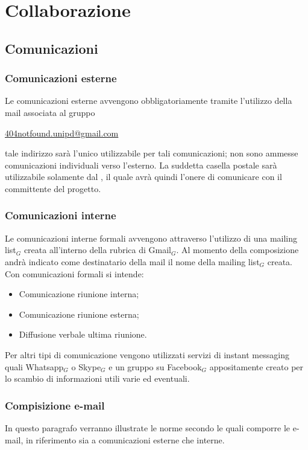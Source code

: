 \section{Collaborazione} \label{collaborazione}
\subsection{Comunicazioni}
\subsubsection{Comunicazioni esterne}
Le comunicazioni esterne avvengono obbligatoriamente tramite l’utilizzo della mail associata al gruppo
\begin{center} \href{mailto:404notfound.unipd@gmail.com}{404notfound.unipd@gmail.com}
\end{center}
tale indirizzo sarà l’unico utilizzabile per tali comunicazioni; non sono ammesse comunicazioni individuali verso l’esterno.
La suddetta casella postale sarà utilizzabile solamente dal \ruoloResponsabile, il quale avrà quindi l’onere di comunicare con il committente del progetto.

\subsubsection{Comunicazioni interne}
Le comunicazioni interne formali avvengono attraverso l’utilizzo di una mailing list$_G$ creata all'interno della rubrica di Gmail$_G$. Al momento della composizione andrà indicato come destinatario della mail il nome della mailing list$_G$ creata.
Con comunicazioni formali si intende:
\begin{itemize}
	\item Comunicazione riunione interna;
	\item Comunicazione riunione esterna;
	\item Diffusione verbale ultima riunione.
\end{itemize}

Per altri tipi di comunicazione vengono utilizzati servizi di instant messaging quali Whatsapp$_G$ o Skype$_G$ e un gruppo su Facebook$_G$ appositamente creato per lo scambio di informazioni utili varie ed eventuali.

\subsubsection{Compisizione e-mail}
In questo paragrafo verranno illustrate le norme secondo le quali comporre le e-mail, in riferimento sia a comunicazioni esterne che interne.

